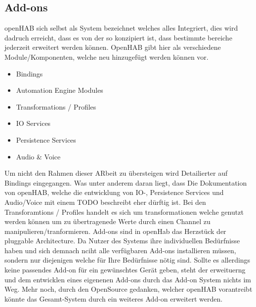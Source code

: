 \subsection{Add-ons}
openHAB sich selbst als System bezeichnet welches alles Integriert, dies wird dadruch erreicht, dass es von der so konzipiert ist, dass bestimmte bereiche jederzeit erweitert werden können. OpenHAB gibt hier als verschiedene Module/Komponenten, welche neu hinzugefügt werden können vor.
\begin{itemize}
	\item Bindings
	\item Automation Engine Modules
	\item Transformations / Profiles
	\item IO Services
	\item Persistence Services
	\item Audio \& Voice
\end{itemize}
Um nicht den Rahmen dieser ARbeit zu übersteigen wird Detailierter auf Bindings eingegangen. Was unter anderem daran liegt, dass Die Dokumentation von openHAB, welche die entwicklung von IO-, Persistence Services und Audio/Voice mit einem TODO beschreibt eher dürftig ist. Bei den Transforamtions / Profiles handelt es sich um transformationen welche genutzt werden können um zu übertragenede Werte durch einen Channel zu manipulieren/tranformieren.
Add-ons sind in openHab das Herzstück der pluggable Architecture. Da Nutzer des Systems ihre individuellen Bedürfnisse haben und sich demnach nciht alle verfügbaren Add-ons installieren müssen, sondern nur diejenigen welche für Ihre Bedürfnisse nötig sind. Sollte es allerdings keine passendes Add-on für ein gewünschtes Gerät geben, steht der erweituerng und dem entwicklen eines eigenenen Add-ons durch das Add-on System nichts im Weg. Mehr noch, durch den OpenSource gedanken, welcher openHAB vorantreibt könnte das Gesamt-System durch ein weiteres Add-on erweitert werden. 

